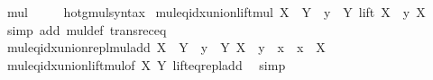 \begin{isabellebody}
\ mul\ {\isacharparenleft}{\kern0pt}\ {\isachardoublequoteopen}{\isacharasterisk}{\kern0pt}{\isachardoublequoteclose}\ {}{}{\isacharparenright}{\kern0pt}\ \isamarkupfalse%
\isanewline
{}\isamarkupfalse%
\ hotg{\isacharunderscore}{\kern0pt}mul{\isacharunderscore}{\kern0pt}syntax\isanewline
\isanewline
{}\isamarkupfalse%
\ mul{\isacharunderscore}{\kern0pt}eq{\isacharunderscore}{\kern0pt}idx{\isacharunderscore}{\kern0pt}union{\isacharunderscore}{\kern0pt}lift{\isacharunderscore}{\kern0pt}mul{\isacharcolon}{\kern0pt}\ {\isachardoublequoteopen}X\ {\isacharasterisk}{\kern0pt}\ Y\ {\isacharequal}{\kern0pt}\ {\isacharparenleft}{\kern0pt}{\isasymUnion}y\ {\isasymin}\ Y{\isachardot}{\kern0pt}\ lift\ {\isacharparenleft}{\kern0pt}X\ {\isacharasterisk}{\kern0pt}\ y{\isacharparenright}{\kern0pt}\ X{\isacharparenright}{\kern0pt}{\isachardoublequoteclose}\isanewline
%
\isadelimproof
\ \ %
\endisadelimproof
%
\isatagproof
{}\isamarkupfalse%
\ {\isacharparenleft}{\kern0pt}simp\ add{\isacharcolon}{\kern0pt}\ mul{\isacharunderscore}{\kern0pt}def\ transrec{\isacharunderscore}{\kern0pt}eq{\isacharparenright}{\kern0pt}%
\endisatagproof
{\isafoldproof}%
%
\isadelimproof
\isanewline
%
\endisadelimproof
\isanewline
{}\isamarkupfalse%
\ mul{\isacharunderscore}{\kern0pt}eq{\isacharunderscore}{\kern0pt}idx{\isacharunderscore}{\kern0pt}union{\isacharunderscore}{\kern0pt}repl{\isacharunderscore}{\kern0pt}mul{\isacharunderscore}{\kern0pt}add{\isacharcolon}{\kern0pt}\ {\isachardoublequoteopen}X\ {\isacharasterisk}{\kern0pt}\ Y\ {\isacharequal}{\kern0pt}\ {\isacharparenleft}{\kern0pt}{\isasymUnion}y\ {\isasymin}\ Y{\isachardot}{\kern0pt}\ {\isacharbraceleft}{\kern0pt}X\ {\isacharasterisk}{\kern0pt}\ y\ {\isacharplus}{\kern0pt}\ x\ {\isacharbar}{\kern0pt}\ x\ {\isasymin}\ X{\isacharbraceright}{\kern0pt}{\isacharparenright}{\kern0pt}{\isachardoublequoteclose}\isanewline
%
\isadelimproof
\ \ %
\endisadelimproof
%
\isatagproof
{}\isamarkupfalse%
\ mul{\isacharunderscore}{\kern0pt}eq{\isacharunderscore}{\kern0pt}idx{\isacharunderscore}{\kern0pt}union{\isacharunderscore}{\kern0pt}lift{\isacharunderscore}{\kern0pt}mul{\isacharbrackleft}{\kern0pt}of\ X\ Y{\isacharbrackright}{\kern0pt}\ lift{\isacharunderscore}{\kern0pt}eq{\isacharunderscore}{\kern0pt}repl{\isacharunderscore}{\kern0pt}add\ \isamarkupfalse%
\ simp%
\endisatagproof
{\isafoldproof}%
%
\isadelimproof
%
\endisadelimproof
%
\isadelimdocument
%
\endisadelimdocument
%
\isatagdocument

\end{isabellebody}
